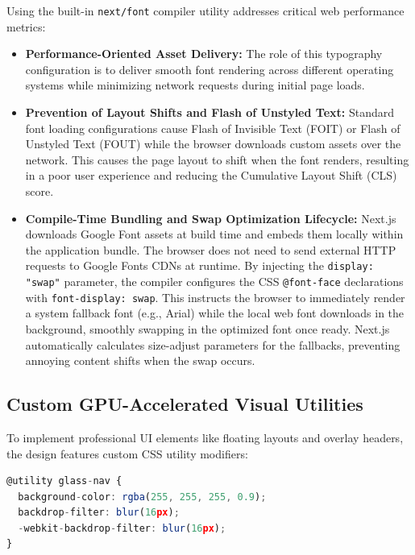 \documentclass[12pt,a4paper]{article}
\begin{document}
Using the built-in \texttt{next/font} compiler utility addresses critical web performance metrics:
\begin{itemize}[leftmargin=2em]
    \item \textbf{Performance-Oriented Asset Delivery:} The role of this typography configuration is to deliver smooth font rendering across different operating systems while minimizing network requests during initial page loads.
    \item \textbf{Prevention of Layout Shifts and Flash of Unstyled Text:} Standard font loading configurations cause Flash of Invisible Text (FOIT) or Flash of Unstyled Text (FOUT) while the browser downloads custom assets over the network. This causes the page layout to shift when the font renders, resulting in a poor user experience and reducing the Cumulative Layout Shift (CLS) score.
    \item \textbf{Compile-Time Bundling and Swap Optimization Lifecycle:} Next.js downloads Google Font assets at build time and embeds them locally within the application bundle. The browser does not need to send external HTTP requests to Google Fonts CDNs at runtime. By injecting the \texttt{display: "swap"} parameter, the compiler configures the CSS \texttt{@font-face} declarations with \texttt{font-display: swap}. This instructs the browser to immediately render a system fallback font (e.g., Arial) while the local web font downloads in the background, smoothly swapping in the optimized font once ready. Next.js automatically calculates size-adjust parameters for the fallbacks, preventing annoying content shifts when the swap occurs.
\end{itemize}

\subsection{Custom GPU-Accelerated Visual Utilities}

To implement professional UI elements like floating layouts and overlay headers, the design features custom CSS utility modifiers:

\begin{lstlisting}[language=TypeScript,title={Custom utility configurations}]
@utility glass-nav {
  background-color: rgba(255, 255, 255, 0.9);
  backdrop-filter: blur(16px);
  -webkit-backdrop-filter: blur(16px);
}
\end{lstlisting}
\end{document}
